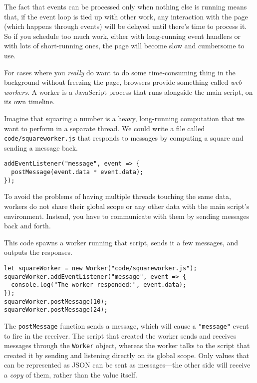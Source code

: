 The fact that events can be processed only when nothing else is running means that, if the event loop is tied up with other work, any interaction with the page (which happens through events) will be delayed until there's time to process it. So if you schedule too much work, either with long-running event handlers or with lots of short-running ones, the page will become slow and cumbersome to use.

For cases where you \emph{really} do want to do some time-consuming thing in the background without freezing the page, browsers provide something called \emph{web workers}. A worker is a JavaScript process that runs alongside the main script, on its own timeline.

Imagine that squaring a number is a heavy, long-running computation that we want to perform in a separate thread. We could write a file called \lstinline`code/squareworker.js` that responds to messages by computing a square and sending a message back.

\begin{lstlisting}
addEventListener("message", event => {
  postMessage(event.data * event.data);
});
\end{lstlisting}
\noindent

To avoid the problems of having multiple threads touching the same data, workers do not share their global scope or any other data with the main script's environment. Instead, you have to communicate with them by sending messages back and forth.

This code spawns a worker running that script, sends it a few messages, and outputs the responses.

\begin{lstlisting}
let squareWorker = new Worker("code/squareworker.js");
squareWorker.addEventListener("message", event => {
  console.log("The worker responded:", event.data);
});
squareWorker.postMessage(10);
squareWorker.postMessage(24);
\end{lstlisting}
\noindent{}

The \lstinline`postMessage` function sends a message, which will cause a \lstinline`"message"` event to fire in the receiver. The script that created the worker sends and receives messages through the \lstinline`Worker` object, whereas the worker talks to the script that created it by sending and listening directly on its global scope. Only values that can be represented as JSON can be sent as messages—the other side will receive a \emph{copy} of them, rather than the value itself.

